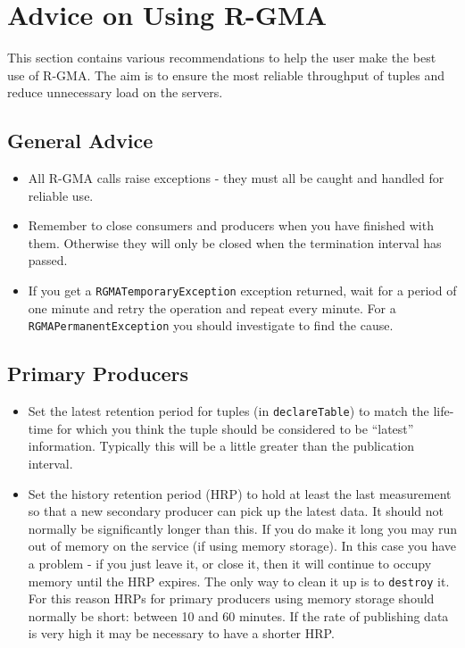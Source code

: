 \section{Advice on Using R-GMA}
\label{sec:advice}

This section contains various recommendations to help the user make
the best use of R-GMA.  The aim is to ensure the most reliable
throughput of tuples and reduce unnecessary load on the servers. 

\subsection{General Advice}

\begin{itemize}
\item{All R-GMA calls raise exceptions - they must all be caught and
  handled for reliable use.} 
\item{Remember to close consumers and producers when you have finished
   with them. Otherwise they will only be closed when the termination
   interval has passed.}
\item{If you get a \texttt{RGMATemporaryException}
  exception returned, wait for a period of one minute and retry the
  operation and repeat every minute.} For a \texttt{RGMAPermanentException} you
  should investigate to find the cause.
\end{itemize}

\subsection{Primary Producers}

\begin{itemize}
\item{Set the latest retention period for tuples (in
  \texttt{declareTable}) to match the life-time for which you think
  the tuple should be considered to be ``latest'' information. Typically
  this will be a little greater than the publication interval.}

\item{Set the history retention period (HRP) to hold at least the last
  measurement so that a new secondary producer can pick up the latest
  data. It should not normally be significantly longer than this. If
  you do make it long you may run out of memory on the service (if
  using memory storage). In this case you have a problem - if you just
  leave it, or close it, then it will continue to occupy memory until
  the HRP expires. The only way to clean it up is to \texttt{destroy}
  it. For this reason HRPs for primary producers using memory storage
  should normally be short: between 10 and 60 minutes. If the rate of
  publishing data is very high it may be necessary to have a shorter
  HRP.}
   
\end{itemize}


